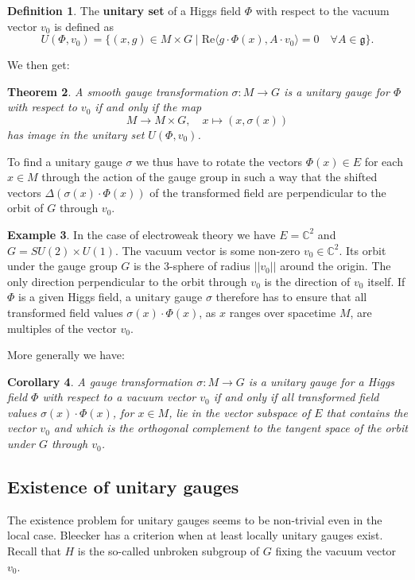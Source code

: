 \documentclass[11pt]{amsart}
\newtheorem{thm}{Theorem}[section]
\newtheorem{cor}[thm]{Corollary}
\theoremstyle{definition}
\newtheorem{ex}[thm]{Example}
\newtheorem{defn}[thm]{Definition}
\theoremstyle{remark}
\numberwithin{equation}{section}
\begin{document}
\begin{defn}The {\bf unitary set} of a Higgs field $\Phi$ with respect to the vacuum vector $v_0$ is defined as
\begin{equation*}
U(\Phi,v_0)=\{(x,g)\in M\times G\mid \mathrm{Re}\langle g\cdot\Phi(x), A\cdot v_0\rangle=0\quad\forall A\in\mathfrak{g}\}.
\end{equation*}
\end{defn}
We then get:
\begin{thm}A smooth gauge transformation $\sigma\colon M\rightarrow G$ is a unitary gauge for $\Phi$ with respect to $v_0$ if and only if the map 
\begin{equation*}
M\longrightarrow M\times G,\quad x \longmapsto (x,\sigma(x))
\end{equation*}
has image in the unitary set $U(\Phi,v_0)$.
\end{thm}
To find a unitary gauge $\sigma$ we thus have to rotate the vectors $\Phi(x)\in E$ for each $x\in M$ through the action of the gauge group in such a way that the shifted vectors $\Delta(\sigma(x)\cdot\Phi(x))$ of the transformed field are perpendicular to the orbit of $G$ through $v_0$.
\begin{ex}In the case of electroweak theory we have $E=\mathbb{C}^2$ and $G=SU(2)\times U(1)$. The vacuum vector is some non-zero $v_0\in\mathbb{C}^2$. Its orbit under the gauge group $G$ is the 3-sphere of radius $||v_0||$ around the origin. The only direction perpendicular to the orbit through $v_0$ is the direction of $v_0$ itself. If $\Phi$ is a given Higgs field, a unitary gauge $\sigma$ therefore has to ensure that all transformed field values $\sigma(x)\cdot\Phi(x)$, as $x$ ranges over spacetime $M$, are multiples of the vector $v_0$.
\end{ex}
More generally we have:
\begin{cor}A gauge transformation $\sigma\colon M\rightarrow G$ is a unitary gauge for a Higgs field $\Phi$ with respect to a vacuum vector $v_0$ if and only if all transformed field values $\sigma(x)\cdot\Phi(x)$, for $x\in M$, lie in the vector subspace of $E$ that contains the vector $v_0$ and which is the orthogonal complement to the tangent space of the orbit under $G$ through $v_0$.
\end{cor}

\subsection{Existence of unitary gauges}
The existence problem for unitary gauges seems to be non-trivial even in the local case. Bleecker has a criterion when at least locally unitary gauges exist. Recall that $H$ is the so-called unbroken subgroup of $G$ fixing the vacuum vector $v_0$.
\end{document}
